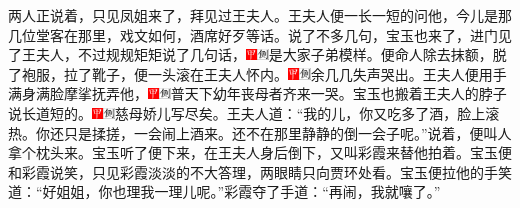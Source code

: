 两人正说着，只见凤姐来了，拜见过王夫人。王夫人便一长一短的问他，今儿是那几位堂客在那里，戏文如何，酒席好歹等话。说了不多几句，宝玉也来了，进门见了王夫人，不过规规矩矩说了几句话，{\includegraphics[width=3mm]{../Images/00002}\includegraphics[width=3mm]{../Images/00011}\footnotesize \kaishu 是大家子弟模样。}便命人除去抹额，脱了袍服，拉了靴子，便一头滚在王夫人怀内。{\includegraphics[width=3mm]{../Images/00002}\includegraphics[width=3mm]{../Images/00011}\footnotesize \kaishu 余几几失声哭出。}王夫人便用手满身满脸摩挲抚弄他，{\includegraphics[width=3mm]{../Images/00002}\includegraphics[width=3mm]{../Images/00011}\footnotesize \kaishu 普天下幼年丧母者齐来一哭。}宝玉也搬着王夫人的脖子说长道短的。{\includegraphics[width=3mm]{../Images/00002}\includegraphics[width=3mm]{../Images/00011}\footnotesize \kaishu 慈母娇儿写尽矣。}王夫人道：“我的儿，你又吃多了酒，脸上滚热。你还只是揉搓，一会闹上酒来。还不在那里静静的倒一会子呢。”说着，便叫人拿个枕头来。宝玉听了便下来，在王夫人身后倒下，又叫彩霞来替他拍着。宝玉便和彩霞说笑，只见彩霞淡淡的不大答理，两眼睛只向贾环处看。宝玉便拉他的手笑道：“好姐姐，你也理我一理儿呢。”彩霞夺了手道：“再闹，我就嚷了。”

